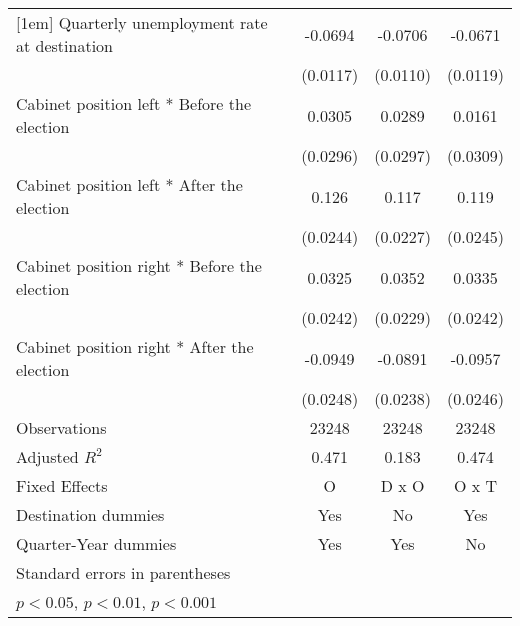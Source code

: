 \begin{table}[htbp]
\begin{tabular}{l*{3}{c}}
[1em]
Quarterly unemployment rate at destination&     -0.0694\sym{***}&     -0.0706\sym{***}&     -0.0671\sym{***}\\
                    &    (0.0117)         &    (0.0110)         &    (0.0119)         \\
[1em]
Cabinet position left * Before the election&      0.0305         &      0.0289         &      0.0161         \\
                    &    (0.0296)         &    (0.0297)         &    (0.0309)         \\
[1em]
Cabinet position left * After the election&       0.126\sym{***}&       0.117\sym{***}&       0.119\sym{***}\\
                    &    (0.0244)         &    (0.0227)         &    (0.0245)         \\
[1em]
Cabinet position right * Before the election&      0.0325         &      0.0352         &      0.0335         \\
                    &    (0.0242)         &    (0.0229)         &    (0.0242)         \\
[1em]
Cabinet position right * After the election&     -0.0949\sym{***}&     -0.0891\sym{***}&     -0.0957\sym{***}\\
                    &    (0.0248)         &    (0.0238)         &    (0.0246)         \\
\hline
Observations        &       23248         &       23248         &       23248         \\
Adjusted \(R^{2}\)  &       0.471         &       0.183         &       0.474         \\
Fixed Effects       &           O         &       D x O         &       O x T         \\
Destination dummies &         Yes         &          No         &         Yes         \\
Quarter-Year dummies&         Yes         &         Yes         &          No         \\
\hline\hline
\multicolumn{4}{l}{\footnotesize Standard errors in parentheses}\\
\multicolumn{4}{l}{\footnotesize \sym{*} \(p<0.05\), \sym{**} \(p<0.01\), \sym{***} \(p<0.001\)}\\
\end{tabular}
\end{table}
